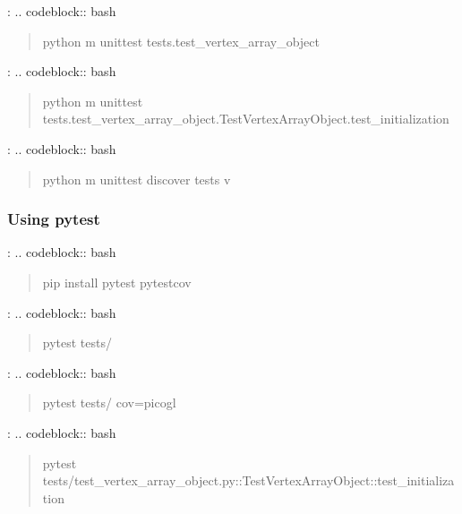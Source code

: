 \documentclass[a4paper,10pt,english,openany,oneside]{sphinxmanual}
\begin{document}
\sphinxAtStartPar
{}:
.. code\sphinxhyphen{}block:: bash
\begin{quote}

\sphinxAtStartPar
python \sphinxhyphen{}m unittest tests.test\_vertex\_array\_object
\end{quote}

\sphinxAtStartPar
{}:
.. code\sphinxhyphen{}block:: bash
\begin{quote}

\sphinxAtStartPar
python \sphinxhyphen{}m unittest tests.test\_vertex\_array\_object.TestVertexArrayObject.test\_initialization
\end{quote}

\sphinxAtStartPar
{}:
.. code\sphinxhyphen{}block:: bash
\begin{quote}

\sphinxAtStartPar
python \sphinxhyphen{}m unittest discover tests \sphinxhyphen{}v
\end{quote}


\subsubsection{Using pytest}
\label{\detokenize{testing:using-pytest}}
\sphinxAtStartPar
{}:
.. code\sphinxhyphen{}block:: bash
\begin{quote}

\sphinxAtStartPar
pip install pytest pytest\sphinxhyphen{}cov
\end{quote}

\sphinxAtStartPar
{}:
.. code\sphinxhyphen{}block:: bash
\begin{quote}

\sphinxAtStartPar
pytest tests/
\end{quote}

\sphinxAtStartPar
{}:
.. code\sphinxhyphen{}block:: bash
\begin{quote}

\sphinxAtStartPar
pytest tests/ \textendash{}cov=picogl
\end{quote}

\sphinxAtStartPar
{}:
.. code\sphinxhyphen{}block:: bash
\begin{quote}

\sphinxAtStartPar
pytest tests/test\_vertex\_array\_object.py::TestVertexArrayObject::test\_initialization
\end{quote}
\end{document}
